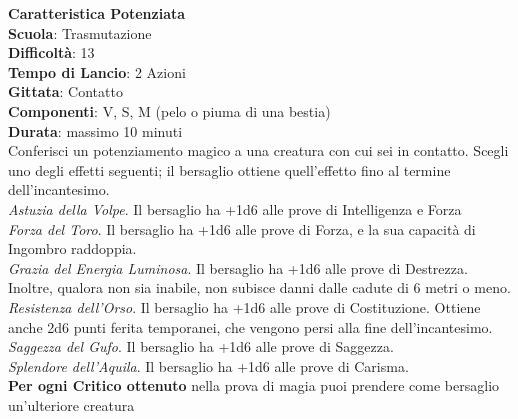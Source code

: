 \begin{multicols}{2}
\medskip\textbf{Caratteristica Potenziata}\\
\textbf{Scuola}: Trasmutazione\\
\textbf{Difficoltà}:  13\\
\textbf{Tempo di Lancio}: 2 Azioni\\
\textbf{Gittata}: Contatto\\
\textbf{Componenti}: V, S, M (pelo o piuma di una bestia)\\
\textbf{Durata}: massimo 10 minuti\\
Conferisci un potenziamento magico a una creatura con cui sei in contatto. Scegli uno degli effetti seguenti; il bersaglio ottiene quell'effetto fino al termine dell'incantesimo.\\
\textit{Astuzia della Volpe}. Il bersaglio ha +1d6 alle prove di Intelligenza e Forza\\
\textit{Forza del Toro}. Il bersaglio ha +1d6 alle prove di Forza, e la sua capacità di Ingombro raddoppia.\\
\textit{Grazia del Energia Luminosa}. Il bersaglio ha +1d6 alle prove di Destrezza. Inoltre, qualora non sia inabile, non subisce danni dalle cadute di 6 metri o meno.\\
\textit{Resistenza dell'Orso}. Il bersaglio ha +1d6 alle prove di Costituzione. Ottiene anche 2d6 punti ferita temporanei, che vengono persi alla fine dell'incantesimo.\\
\textit{Saggezza del Gufo}. Il bersaglio ha +1d6 alle prove di Saggezza. \\
\textit{Splendore dell'Aquila}. Il bersaglio ha +1d6 alle prove di Carisma.\\
\textbf{Per ogni Critico ottenuto} nella prova di magia puoi prendere come bersaglio un'ulteriore creatura


\end{multicols}
